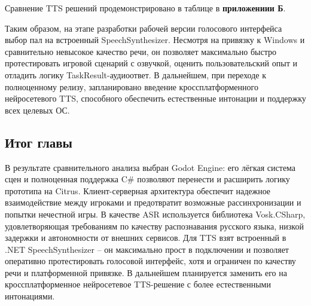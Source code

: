         Сравнение TTS решений продемонстрировано в таблице в \textbf{приложениии Б}.

        Таким образом, на этапе разработки рабочей версии голосового интерфейса выбор пал на встроенный SpeechSynthesizer. Несмотря на привязку к Windows и сравнительно невысокое качество речи, он позволяет максимально быстро протестировать игровой сценарий с озвучкой, оценить пользовательский опыт и отладить логику TaskResult-аудиоответ. В дальнейшем, при переходе к полноценному релизу, запланировано введение кроссплатформенного нейросетевого TTS, способного обеспечить естественные интонации и поддержку всех целевых ОС.

    \subsection{Итог главы}
        В результате сравнительного анализа выбран Godot Engine: его лёгкая система сцен и полноценная поддержка C\# позволяют перенести и расширить логику прототипа на Citrus. Клиент-серверная архитектура обеспечит надежное взаимодействие между игроками и предотвратит возможные рассинхронизации и попытки нечестной игры. В качестве ASR используется библиотека Vosk.CSharp, удовлетворяющая требованиям по качеству распознавания русского языка, низкой задержки и автономности от внешних сервисов. Для TTS взят встроенный в .NET SpeechSynthesizer -- он максимально прост в подключении и позволяет оперативно протестировать голосовой интерфейс, хотя и ограничен по качеству речи и платформенной привязке. В дальнейшем планируется заменить его на кроссплатформенное нейросетевое TTS-решение с более естественными интонациями.
